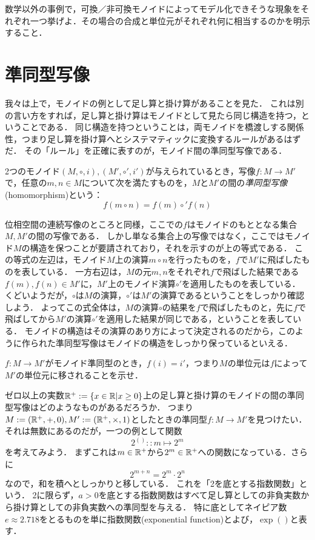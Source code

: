 \documentclass[11pt,a4paper]{jsarticle}
\begin{document}
\begin{exercise}    数学以外の事例で，可換／非可換モノイドによってモデル化できそうな現象をそれぞれ一つ挙げよ．その場合の合成と単位元がそれぞれ何に相当するのかを明示すること．
\end{exercise}    


\section{準同型写像}
我々は上で，モノイドの例として足し算と掛け算があることを見た．
これは別の言い方をすれば，足し算と掛け算はモノイドとして見たら同じ構造を持つ，ということである．
同じ構造を持つということは，両モノイドを橋渡しする関係性，つまり足し算を掛け算へとシステマティックに変換するルールがあるはずだ．
その「ルール」を正確に表すのが，モノイド間の準同型写像である．

\begin{dfn}[準同型]
    2つのモノイド$(M, \circ, i), (M', \circ', i')$が与えられているとき，写像$f:M \to M'$で，任意の$m,n \in M$について次を満たすものを，$M$と$M'$の間の\emph{準同型写像}(homomorphism)という：
    \[f(m \circ n) = f(m) \circ' f(n)\]
\end{dfn}

位相空間の連続写像のところと同様，ここでの$f$はモノイドのもととなる集合$M,M'$の間の写像である．
しかし単なる集合上の写像ではなく，ここではモノイド$M$の構造を保つことが要請されており，それを示すのが上の等式である．
この等式の左辺は，モノイド$M$上の演算$m \circ n$を行ったものを，$f$で$M'$に飛ばしたものを表している．
一方右辺は，$M$の元$m,n$をそれぞれ$f$で飛ばした結果である$f(m), f(n) \in M'$に，$M'$上のモノイド演算$\circ'$を適用したものを表している．
くどいようだが，$\circ$は$M$の演算，$\circ'$は$M'$の演算であるということをしっかり確認しよう．
よってこの式全体は，$M$の演算$\circ$の結果を$f$で飛ばしたものと，先に$f$で飛ばしてから$M'$の演算$\circ'$を適用した結果が同じである，ということを表している．
モノイドの構造はその演算のあり方によって決定されるのだから，このように作られた準同型写像はモノイドの構造をしっかり保っているといえる．

\begin{exercise}
    $f:M \to M'$がモノイド準同型のとき，$f(i) = i'$，つまり$M$の単位元は$f$によって$M'$の単位元に移されることを示せ．
\end{exercise}

ゼロ以上の実数$\mathbb{R}^+ := \{x \in \mathbb{R} | x \geq 0 \}$上の足し算と掛け算のモノイドの間の準同型写像はどのようなものがあるだろうか．
つまり$M := (\mathbb{R}^+, +, 0), M' := (\mathbb{R}^+, \times, 1)$としたときの準同型$f:M \to M'$を見つけたい．
それは無数にあるのだが，一つの例として関数
\[ 2^{()} :: m \mapsto 2^m \]
を考えてみよう．
まずこれは$m \in \mathbb{R}^+$から$2^m \in \mathbb{R}^+$への関数になっている．さらに
\[ 2^{m + n} = 2^m \cdot 2^n \]
なので，和を積へとしっかりと移している．
これを「2を底とする指数関数」という．
2に限らず，$a>0$を底とする指数関数はすべて足し算としての非負実数から掛け算としての非負実数への準同型を与える．
特に底としてネイピア数$e\approx 2.718$をとるものを単に指数関数(exponential function)とよび，$\exp()$と表す．
\end{document}
